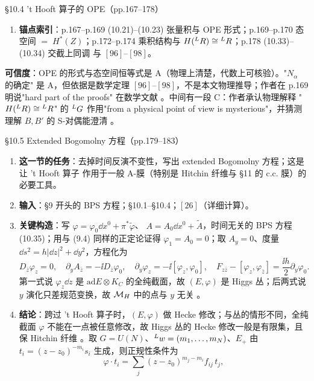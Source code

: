 \begin{kcard}{\S10.4 't Hooft 算子的 OPE（pp.167--178）}
\begin{enumerate}[label=\textbf{\arabic*}]
\item \textbf{锚点索引}：p.167--p.169 (10.21)--(10.23) 张量积与 OPE 形式；p.169--p.170 态空间
  $=\;H^*(Z)$；p.172--p.174 乘积结构与 $H({}^{L}R)\cong{}^{L}R$；p.178 (10.33)--(10.34) 交截上同调
  与 $[96]$--$[98]$。
\end{enumerate}
\textbf{可信度}：OPE 的形式与态空间恒等式是 A（物理上清楚，代数上可核验）。"$N_\alpha$ 的确定"
是 A，但依据是数学定理 $[96]$--$[98]$，不是本文物理推导；作者在 p.169 明说"hard part of the proofs"
在数学文献 \pA{}。中间有一段 C：作者承认物理解释 "$H({}^{L}R)\cong{}^{L}R$" 的
${}^{L}G$ 作用"from a physical point of view is mysterious"，并猜测理解 $B,B'$ 的 S-对偶能澄清
\pC{}。
\end{kcard}

\begin{kcard}{\S10.5 Extended Bogomolny 方程（pp.179--183）}
\begin{enumerate}[label=\textbf{\arabic*}]
\item \textbf{这一节的任务}：去掉时间反演不变性，写出 extended Bogomolny 方程；这是让 't Hooft 算子
  作用于一般 A-膜（特别是 Hitchin 纤维与 \S11 的 c.c. 膜）的必要工具。
\item \textbf{输入}：\S9 开头的 BPS 方程；\S10.1--\S10.4；$[26]$（详细计算）。
\item \textbf{关键构造}：写 $\varphi=\varphi_0\dd x^0+\pi^*\tilde\varphi$、
  $A=A_0\dd x^0+\tilde A$，时间无关的 BPS 方程 (10.35)；用与 (9.4) 同样的正定论证得
  $\varphi_1=A_0=0$；取 $A_y=0$、度量 $\dd s^2=h|\dd z|^2+\dd y^2$，方程化为
\begin{equation}
D_{\bar z}\varphi_z=0,\quad
\partial_yA_{\bar z}=-\ii D_{\bar z}\varphi_0,\quad
\partial_y\varphi_z=-\ii[\varphi_z,\varphi_0],\quad
F_{z\bar z}-[\varphi_z,\varphi_{\bar z}]=\frac{\ii h}{2}\partial_y\varphi_0 .
\label{eq:geom-extended}
\end{equation}
  第一式说 $\varphi_z\dd z$ 是 $\mathrm{ad}E\otimes K_C$ 的全纯截面，故 $(E,\varphi)$ 是 Higgs
  丛；后两式说 $y$ 演化只差规范变换，故 $\mathcal{M}_H$ 中的点与 $y$ 无关 \pA{}。
\item \textbf{结论}：跨过 't Hooft 算子时，$(E,\varphi)$ 做 Hecke 修改；与丛的情形不同，全纯截面
  $\varphi$ 不能在一点被任意修改，故 Higgs 丛的 Hecke 修改一般是有限集，且保 Hitchin 纤维
  \pA{}。取 $G=U(N)$、${}^{L}w=(m_1,\dots,m_N)$、$E_+$ 由
  $t_i=(z-z_0)^{-m_i}s_i$ 生成，则正规性条件为
\begin{equation}
\varphi\cdot t_i=\sum_j(z-z_0)^{m_j-m_i}f_{ij}\,t_j ,
\label{eq:geom-higgs-hecke}

\end{equation}
\end{enumerate}
\end{kcard}
